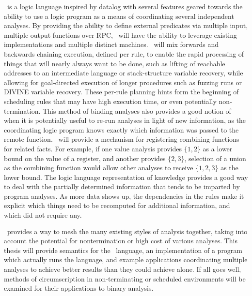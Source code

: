 \sysname\ is a logic language inspired by datalog with several features geared towards the ability to use a logic program as a means of coordinating several independent analyses.
By providing the ability to define external predicates via multiple input, multiple output functions over RPC, \sysname\ will have the ability to leverage existing implementations and multiple distinct machines.
\sysname\ will mix forwards and backwards chaining execution, defined per rule, to enable the rapid processing of things that will nearly always want to be done, such as lifting of reachable addresses to an intermediate language or stack-structure variable recovery, while allowing for goal-directed execution of longer procedures such as fuzzing runs or DIVINE variable recovery.
These per-rule planning hints form the beginning of scheduling rules that may have high execution time, or even potentially non-termination.
This method of binding analyses also provides a good notion of when it is potentially useful to re-run analyses in light of new information, as the coordinating logic program knows exactly which information was passed to the remote function.
\sysname\ will provide a mechanism for registering combining functions for related facts.
For example, if one value analysis provides $\{1, 2\}$ as a lower bound on the value of a register, and another provides $\{2, 3\}$, selection of a union as the combining function would allow other analyses to receive $\{1, 2, 3\}$ as the lower bound.
The logic language representation of knowledge provides a good way to deal with the partially determined information that tends to be imparted by program analyses. As more data shows up, the dependencies in the rules make it explicit which things need to be recomputed for additional information, and which did not require any.

\sysname\ provides a way to mesh the many existing styles of analysis together, taking into account the potential for nontermination or high cost of various analyses. This thesis will provide semantics for the \sysname\ language, an implementation of a program which actually runs the language, and example applications coordinating multiple analyses to achieve better results than they could achieve alone. If all goes well, methods of circumscription in non-terminating or scheduled environments will be examined for their applications to binary analysis.
